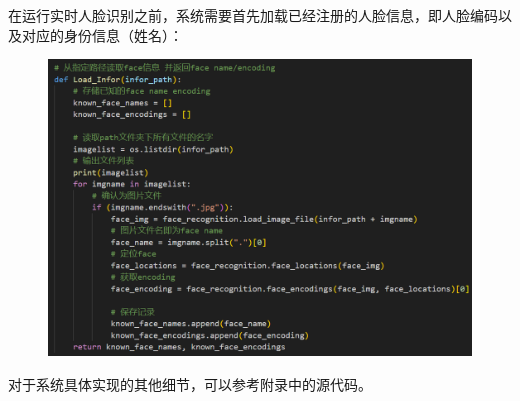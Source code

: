 \documentclass[UTF8]{article}
\begin{document}
在运行实时人脸识别之前，系统需要首先加载已经注册的人脸信息，即人脸编码以及对应的身份信息（姓名）：
\begin{figure}[H]
    \centering %
    \includegraphics[width=1\textwidth]{figure/load_infor.png} 
\end{figure}
对于系统具体实现的其他细节，可以参考附录中的源代码。

\end{document}
